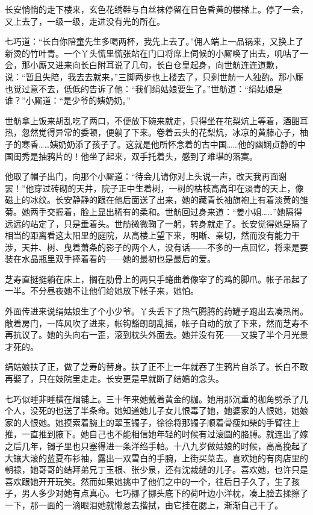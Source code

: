 \par 长安悄悄的走下楼来，玄色花绣鞋与白丝袜停留在日色昏黄的楼梯上。停了一会，又上去了，一级一级，走进没有光的所在。
\par 七巧道：“长白你陪童先生多喝两杯，我先上去了。”佣人端上一品锅来，又换上了新烫的竹叶青。一个丫头慌里慌张站在门口将席上伺候的小厮唤了出去，叽咕了一会，那小厮又进来向长白附耳说了几句，长白仓皇起身，向世舫连连道歉，说：“暂且失陪，我去去就来，”三脚两步也上楼去了，只剩世舫一人独酌。那小厮也觉过意不去，低低的告诉了他：“我们绢姑娘要生了。”世舫道：“绢姑娘是谁？”小厮道：“是少爷的姨奶奶。”
\par 世舫拿上饭来胡乱吃了两口，不便放下碗来就走，只得坐在花梨炕上等着，酒酣耳热，忽然觉得异常的委顿，便躺了下来。卷着云头的花梨炕，冰凉的黄藤心子，柚子的寒香……姨奶奶添了孩子了。这就是他所怀念着的古中国……他的幽娴贞静的中国闺秀是抽鸦片的！他坐了起来，双手托着头，感到了难堪的落寞。
\par 他取了帽子出门，向那个小厮道：“待会儿请你对上头说一声，改天我再面谢罢！”他穿过砖砌的天井，院子正中生着树，一树的枯枝高高印在淡青的天上，像磁上的冰纹。长安静静的跟在他后面送了出来，她的藏青长袖旗袍上有着淡黄的雏菊。她两手交握着，脸上显出稀有的柔和。世舫回过身来道：“姜小姐……”她隔得远远的站定了，只是垂着头。世舫微微鞠了一躬，转身就走了。长安觉得她是隔了相当的距离看这太阳里的庭院，从高楼上望下来，明晰、亲切，然而没有能力干涉，天井、树、曳着萧条的影子的两个人，没有话——不多的一点回忆，将来是要装在水晶瓶里双手捧着看的——她的最初也是最后的爱。
\par 芝寿直挺挺躺在床上，搁在肋骨上的两只手蜷曲着像宰了的鸡的脚爪。帐子吊起了一半。不分昼夜她不让他们给她放下帐子来，她怕。
\par 外面传进来说绢姑娘生了个小少爷。丫头丢下了热气腾腾的药罐子跑出去凑热闹。敞着房门，一阵风吹了进来，帐钩豁朗朗乱摇，帐子自动的放了下来，然而芝寿不再抗议了。她的头向右一歪，滚到枕头外面去。她并没有死——又挨了半个月光景才死的。
\par 绢姑娘扶了正，做了芝寿的替身。扶了正不上一年就吞了生鸦片自杀了。长白不敢再娶了，只在妓院里走走。长安更是早就断了结婚的念头。
\par 七巧似睡非睡横在烟铺上。三十年来她戴着黄金的枷。她用那沉重的枷角劈杀了几个人，没死的也送了半条命。她知道她儿子女儿恨毒了她，她婆家的人恨她，她娘家的人恨她。她摸索着腕上的翠玉镯子，徐徐将那镯子顺着骨瘦如柴的手臂往上推，一直推到腋下。她自己也不能相信她年轻的时候有过滚圆的胳膊。就连出了嫁之后几年，镯子里也只塞得进一条洋绉手帕。十八九岁做姑娘的时候，高高挽起了大镶大滚的蓝夏布衫袖，露出一双雪白的手腕，上街买菜去。喜欢她的有肉店里的朝禄，她哥哥的结拜弟兄丁玉根、张少泉，还有沈裁缝的儿子。喜欢她，也许只是喜欢跟她开开玩笑。然而如果她挑中了他们之中的一个，往后日子久了，生了孩子，男人多少对她有点真心。七巧挪了挪头底下的荷叶边小洋枕，凑上脸去揉擦了一下，那一面的一滴眼泪她就懒怠去揩拭，由它挂在腮上，渐渐自己干了。

